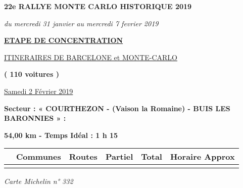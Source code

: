 \documentclass{article}%
\begin{document}
%
\normalsize%
\begin{center} \textbf{\LARGE{22e RALLYE MONTE CARLO HISTORIQUE 2019}} \end{center}%
\begin{flushleft} \textit{du mercredi 31 janvier au mercredi 7 fevrier 2019} \end{flushleft}%
\begin{center} \textbf{\underline{ETAPE DE CONCENTRATION}} \end{center}%
\begin{center} \underline{ITINERAIRES DE BARCELONE et MONTE-CARLO} \end{center}%
\begin{center} \textbf{( 110 voitures )} \end{center}%
\begin{flushright} \underline{ Samedi 2 Février 2019} \end{flushright}%
\begin{flushleft} \textbf{Secteur : « COURTHEZON - (Vaison la Romaine) -  BUIS LES BARONNIES » :
} \end{flushleft}%
\begin{flushright} \textbf{54,00 km - Temps Idéal : 1 h 15
} \end{flushright}%
\begin{longtable}{p{2.25cm}|p{7.0cm}|p{1.5cm}|p{1.5cm}|p{1.5cm}|p{3.5cm}}%
\hline%
&Communes&Routes&Partiel&Total&Horaire Approx\\%
\hline%
\endhead%
\endfoot%
\endlastfoot%
\hline%
\end{longtable}%
\begin{flushleft} \textit{Carte Michelin n° 332
} \end{flushleft}%
\end{document}
